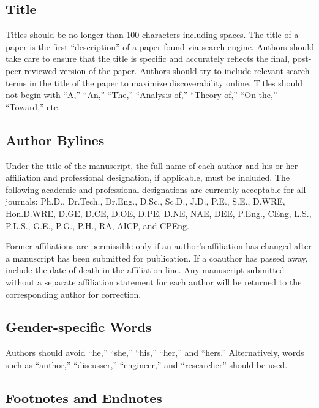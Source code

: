 \documentclass[NewProceedings, InsideFigs,LineNumbers]{asce-quarto}
\begin{document}
\subsection{Title}\label{title}

Titles should be no longer than 100 characters including spaces. The
title of a paper is the first ``description'' of a paper found via
search engine. Authors should take care to ensure that the title is
specific and accurately reflects the final, post-peer reviewed version
of the paper. Authors should try to include relevant search terms in the
title of the paper to maximize discoverability online. Titles should not
begin with ``A,'' ``An,'' ``The,'' ``Analysis of,'' ``Theory of,'' ``On
the,'' ``Toward,'' etc.

\subsection{Author Bylines}\label{author-bylines}

Under the title of the manuscript, the full name of each author and his
or her affiliation and professional designation, if applicable, must be
included. The following academic and professional designations are
currently acceptable for all journals: Ph.D., Dr.Tech., Dr.Eng., D.Sc.,
Sc.D., J.D., P.E., S.E., D.WRE, Hon.D.WRE, D.GE, D.CE, D.OE, D.PE, D.NE,
NAE, DEE, P.Eng., CEng, L.S., P.L.S., G.E., P.G., P.H., RA, AICP, and
CPEng.

Former affiliations are permissible only if an author's affiliation has
changed after a manuscript has been submitted for publication. If a
coauthor has passed away, include the date of death in the affiliation
line. Any manuscript submitted without a separate affiliation statement
for each author will be returned to the corresponding author for
correction.

\subsection{Gender-specific Words}\label{gender-specific-words}

Authors should avoid ``he,'' ``she,'' ``his,'' ``her,'' and ``hers.''
Alternatively, words such as ``author,'' ``discusser,'' ``engineer,''
and ``researcher'' should be used.

\subsection{Footnotes and Endnotes}\label{footnotes-and-endnotes}
\end{document}
